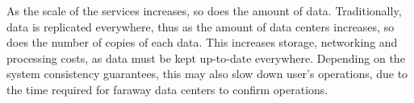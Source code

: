 As the scale of the services increases, so does the amount of data.
Traditionally, data is replicated everywhere, thus as the amount of data centers increases, so does the number of copies of each data.
This increases storage, networking and processing costs, as data must be kept up-to-date everywhere.
Depending on the system consistency guarantees, this may also slow down user's operations, 
due to the time required for faraway data centers to confirm operations.




